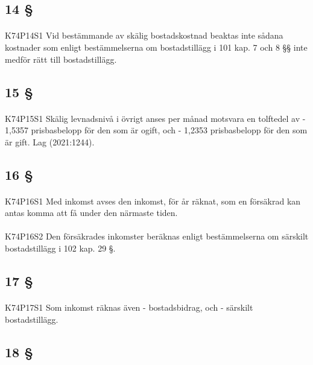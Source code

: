 \documentclass[a4paper,notitlepage,openany,10pt]{book}
\begin{document}
\subsection*{14 §}
\paragraph*{}
{\tiny K74P14S1}
Vid bestämmande av skälig bostadskostnad beaktas inte sådana kostnader som enligt bestämmelserna om bostadstillägg i 101 kap. 7 och 8 §§ inte medför rätt till bostadstillägg.
\subsection*{15 §}
\paragraph*{}
{\tiny K74P15S1}
Skälig levnadsnivå i övrigt anses per månad motsvara en tolftedel av
\newline - 1,5357 prisbasbelopp för den som är ogift, och
\newline - 1,2353 prisbasbelopp för den som är gift.
Lag (2021:1244).
\subsection*{16 §}
\paragraph*{}
{\tiny K74P16S1}
Med inkomst avses den inkomst, för år räknat, som en försäkrad kan antas komma att få under den närmaste tiden.
\paragraph*{}
{\tiny K74P16S2}
Den försäkrades inkomster beräknas enligt bestämmelserna om särskilt bostadstillägg i 102 kap. 29 §.
\subsection*{17 §}
\paragraph*{}
{\tiny K74P17S1}
Som inkomst räknas även
\newline - bostadsbidrag, och
\newline - särskilt bostadstillägg.
\subsection*{18 §}
\end{document}
